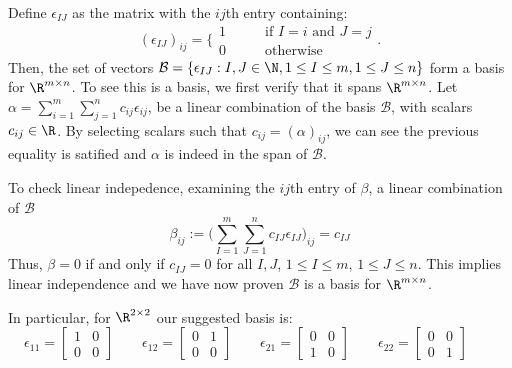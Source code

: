 \documentclass{homework}
\begin{document}
\begin{letterenum}
    \item Define $\epsilon_{IJ}$ as the matrix with the $ij$th entry containing:
        \begin{equation}
            (\epsilon_{IJ})_{ij} = \biggl\{
                \begin{array}{ll}
                    1 &\qquad \text{if }I=i\text{ and }J=j \\
                    0 &\qquad \text{otherwise}
                \end{array}
            \biggr.
        \end{equation}
        Then, the set of vectors $\mathcal{B} = \{\epsilon_{IJ}: I,J \in \N, 1 \leq I \leq m, 1 \leq J \leq n\}$
        form a basis for $\R^{m \times n}$. To see this is a basis, we first verify
        that it spans $\R^{m \times n}$. Let $\alpha = \sum_{i=1}^{m} \sum_{j=1}^{n} c_{ij} \epsilon_{ij}$,
        be a linear combination of the basis $\mathcal{B}$, with scalars $c_{ij} \in \R$.
        By selecting scalars such that $c_{ij} = (\alpha)_{ij}$, we can see the previous equality is
        satified and $\alpha$ is indeed in the span of $\mathcal{B}$.

        To check linear indepedence, examining the $ij$th entry of $\beta$, a linear combination
        of $\mathcal{B}$
        \begin{equation}
            \beta_{ij} := \biggl(\sum_{I=1}^{m} \sum_{J=1}^{n} c_{IJ} \epsilon_{IJ}
                \biggr)_{ij} = c_{IJ}
        \end{equation}
        Thus, $\beta = 0$ if and only if $c_{IJ} = 0$ for all $I,J$,
        $1 \leq I \leq m$, $1 \leq J \leq n$. This implies linear independence and
        we have now proven $\mathcal{B}$ is a basis for $\R^{m \times n}$.

        In particular, for $\R^{2 \times 2}$ our suggested basis is:
        \begin{equation}
            \boxed{
            \epsilon_{11} = \begin{bmatrix}
                1 & 0 \\ 0 & 0
            \end{bmatrix} \qquad
            \epsilon_{12} = \begin{bmatrix}
                0 & 1 \\ 0 & 0
            \end{bmatrix} \qquad
            \epsilon_{21} = \begin{bmatrix}
                0 & 0 \\ 1 & 0
            \end{bmatrix} \qquad
            \epsilon_{22} = \begin{bmatrix}
                0 & 0 \\ 0 & 1
            \end{bmatrix} \qquad
            }
        \end{equation}


\end{letterenum}
\end{document}
